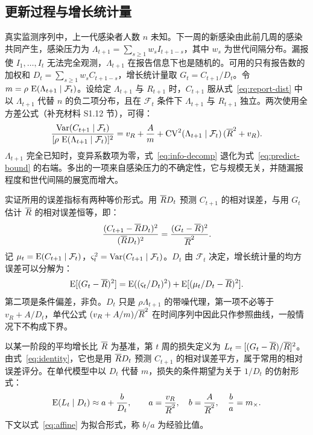 \subsection{更新过程与增长统计量}
\label{sec:meth-renewal}

真实监测序列中，上一代感染者人数 $n$ 未知。下一周的新感染由此前几周的感染共同产生，感染压力为 $\Lambda_{t+1}=\sum_{s\geq1}w_sI_{t+1-s}$，其中 $w_s$ 为世代间隔分布\citep{fraser2007estimating, cori2013new}。漏报使 $I_1,\dots,I_t$ 无法完全观测，$\Lambda_{t+1}$ 在报告信息下也是随机的。可用的只有报告数的加权和 $D_t=\sum_{s\geq1}w_sC_{t+1-s}$，增长统计量取 $G_t=C_{t+1}/D_t$。令 $m=\rho\,\operatorname{E}(\Lambda_{t+1}\mid\mathcal F_t)$。设给定 $\Lambda_{t+1}$ 与 $R_{t+1}$ 时，$C_{t+1}$ 服从式~\eqref{eq:report-dist} 中以 $\Lambda_{t+1}$ 代替 $n$ 的负二项分布，且在 $\mathcal F_t$ 条件下 $\Lambda_{t+1}$ 与 $R_{t+1}$ 独立。两次使用全方差公式（补充材料 S1.12 节），可得：
\begin{equation}
  \frac{\operatorname{Var}(C_{t+1}\mid\mathcal F_t)}{[\rho\,\operatorname{E}(\Lambda_{t+1}\mid\mathcal F_t)]^2}
  =v_R+\frac{A}{m}+\operatorname{CV}^2(\Lambda_{t+1}\mid\mathcal F_t)\,(\overline{R}^2+v_R).
  \label{eq:info-decomp}
\end{equation}
$\Lambda_{t+1}$ 完全已知时，变异系数项为零，式~\eqref{eq:info-decomp} 退化为式~\eqref{eq:predict-bound} 的右端。多出的一项来自感染压力的不确定性，它与规模无关，并随漏报程度和世代间隔的展宽而增大。

实证所用的误差指标有两种等价形式。用 $\overline{R} D_t$ 预测 $C_{t+1}$ 的相对误差，与用 $G_t$ 估计 $\overline{R}$ 的相对误差恒等，即：
\begin{equation}
  \frac{(C_{t+1}-\overline{R} D_t)^2}{(\overline{R} D_t)^2}=\frac{(G_t-\overline{R})^2}{\overline{R}^2}.
  \label{eq:identity}
\end{equation}
记 $\mu_t=\operatorname{E}(C_{t+1}\mid\mathcal F_t)$，$\varsigma_t^2=\operatorname{Var}(C_{t+1}\mid\mathcal F_t)$。$D_t$ 由 $\mathcal F_t$ 决定，增长统计量的均方误差可以分解为：
\begin{equation}
  \operatorname{E}[(G_t-\overline{R})^2]=\operatorname{E}((\varsigma_t/D_t)^2)+\operatorname{E}[(\mu_t/D_t-\overline{R})^2].
  \label{eq:mse-decomp}
\end{equation}
第二项是条件偏差，非负。$D_t$ 只是 $\rho\Lambda_{t+1}$ 的带噪代理，第一项不必等于 $v_R+A/D_t$，单代公式 $(v_R+A/m)/\overline{R}^2$ 在时间序列中因此只作参照曲线，一般情况下不构成下界。

以某一阶段的平均增长比 $\overline{R}$ 为基准，第 $t$ 周的损失定义为 $L_t=[(G_t-\overline{R})/\overline{R}]^2$。由式~\eqref{eq:identity}，它也是用 $\overline{R} D_t$ 预测 $C_{t+1}$ 的相对误差平方，属于常用的相对误差评分\citep{bosse2023scoring}。在单代模型中以 $D_t$ 代替 $m$，损失的条件期望为关于 $1/D_t$ 的仿射形式：
\begin{equation}
  \operatorname{E}(L_t\mid D_t)\approx a+\frac{b}{D_t},\qquad a=\frac{v_R}{\overline{R}^2},\quad b=\frac{A}{\overline{R}^2},\quad \frac ba=m_{\times}.
  \label{eq:affine}
\end{equation}
下文以式~\eqref{eq:affine} 为拟合形式，称 $b/a$ 为经验比值。

